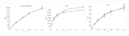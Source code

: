 \documentclass[a4paper]{report}
\newcommand{\wratio}{0.16}
\begin{document}
\includegraphics[width=\wratio\textwidth]{maxcut/HAMSTERSTER/fs_hamsterster}\hfill
\includegraphics[width=\wratio\textwidth]{maxcut/JDK/fs_jdk}\hfill
\includegraphics[width=\wratio\textwidth]{maxcut/PGP/fs_pgp}\hfill
\end{document}
